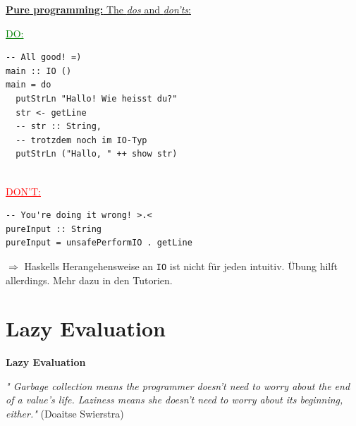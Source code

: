 \documentclass[unknownkeysallowed]{beamer}
\begin{document}
\begin{frame}[fragile]

\underline{\textbf{Pure programming:} The \emph{dos} and \emph{don'ts}:} \pause

\begin{multicols}{2}

\textcolor{green}{\underline{DO:}} \bigskip

\begin{verbatim}
-- All good! =)
main :: IO ()
main = do
  putStrLn "Hallo! Wie heisst du?"
  str <- getLine
  -- str :: String, 
  -- trotzdem noch im IO-Typ
  putStrLn ("Hallo, " ++ show str) 
  
\end{verbatim}

\columnbreak
\pause

\textcolor{red}{\underline{DON'T:}} \bigskip

\begin{verbatim}
-- You're doing it wrong! >.<
pureInput :: String
pureInput = unsafePerformIO . getLine
\end{verbatim}

\vfill

\end{multicols}

\pause
$\Rightarrow$ Haskells Herangehensweise an \texttt{IO} ist nicht für jeden intuitiv.
 Übung hilft allerdings. Mehr dazu in den Tutorien.

\end{frame}


  
\section{Lazy Evaluation}
\begin{frame}

    \begin{center}
    \Large\textbf{Lazy Evaluation} \scriptsize \bigskip
    
    \textit{" Garbage collection means the programmer doesn't need to worry about the end of 
    a value's life. Laziness means she doesn't need to worry about its beginning, 
    either."}
    (Doaitse Swierstra)
    
    \end{center}

\end{frame}
\end{document}
